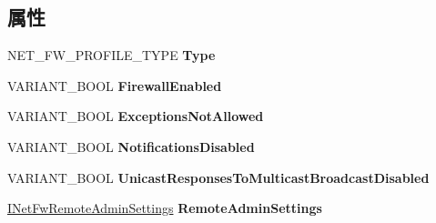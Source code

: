 \subsection*{属性}
\begin{DoxyCompactItemize}
\item 
\mbox{\label{interface_i_net_fw_profile_a15b9d7c6553f57b0ac9d2610e892d665}} 
N\+E\+T\+\_\+\+F\+W\+\_\+\+P\+R\+O\+F\+I\+L\+E\+\_\+\+T\+Y\+PE {\bfseries Type}
\item 
\mbox{\label{interface_i_net_fw_profile_a01f040b934b3ed0053bcde043f5ea402}} 
V\+A\+R\+I\+A\+N\+T\+\_\+\+B\+O\+OL {\bfseries Firewall\+Enabled}
\item 
\mbox{\label{interface_i_net_fw_profile_a345a3518b36f753159e0bf4c85255966}} 
V\+A\+R\+I\+A\+N\+T\+\_\+\+B\+O\+OL {\bfseries Exceptions\+Not\+Allowed}
\item 
\mbox{\label{interface_i_net_fw_profile_a66651e54768205dbe3753a8588199ae0}} 
V\+A\+R\+I\+A\+N\+T\+\_\+\+B\+O\+OL {\bfseries Notifications\+Disabled}
\item 
\mbox{\label{interface_i_net_fw_profile_aa237f27294b273401c60a2c77ec60844}} 
V\+A\+R\+I\+A\+N\+T\+\_\+\+B\+O\+OL {\bfseries Unicast\+Responses\+To\+Multicast\+Broadcast\+Disabled}
\item 
\mbox{\label{interface_i_net_fw_profile_ae8b7e58534a1345fcf0ad50fd089549e}} 
\hyperlink{interface_i_net_fw_remote_admin_settings}{I\+Net\+Fw\+Remote\+Admin\+Settings} {\bfseries Remote\+Admin\+Settings}
\item 
\mbox{\label{interface_i_net_fw_profile_a3232491e80b5bba455cde3a53337fca0}} 

\end{DoxyCompactItemize}
